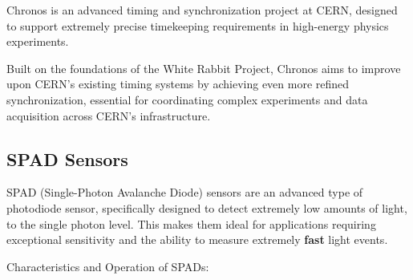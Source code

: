 Chronos is an advanced timing and synchronization project at CERN, designed to support extremely precise timekeeping requirements in high-energy physics experiments. 

\vspace{5 mm}

\noindent Built on the foundations of the White Rabbit Project, Chronos \cite{gl:chronos} aims to improve upon CERN’s existing timing systems by achieving even more refined synchronization, essential for coordinating complex experiments and data acquisition across CERN’s infrastructure.

\subsection{SPAD Sensors}

SPAD (Single-Photon Avalanche Diode) \cite{9031298} sensors are an advanced type of photodiode sensor, specifically designed to detect extremely low amounts of light, to the single photon level. 
This makes them ideal for applications requiring exceptional sensitivity and the ability to measure extremely \textbf{fast} light events.

\vspace{5 mm}

\noindent Characteristics and Operation of SPADs:

